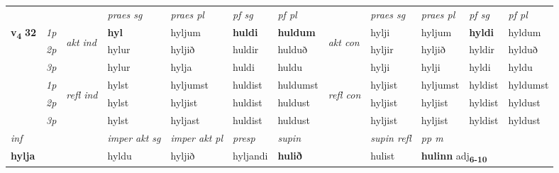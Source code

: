 \begin{longtable}[l]{X>{\footnotesize\itshape}llXXXXlXXXX}
 & &   & \textit{praes sg}  & \textit{praes pl}    & \textit{ pf sg} & \textit{pf pl} & & \textit{praes sg}  & \textit{praes pl}    & \textit{pf sg} & \textit{pf pl }  \\ \cmidrule{4-7} \cmidrule{9-12}
 \multirow{2}{*}{{{\textbf{v{\textsubscript{4}}} \Large{\textbf{32}}}}}  & 1p & \multirow{3}{*}{\begin{turn}{90}\textit{akt ind}\end{turn}} & \textbf{hyl} & hyljum & \textbf{huldi} & \textbf{huldum} & \multirow{3}{*}{\begin{turn}{90}\textit{akt con}\end{turn}} &hylji & hyljum & \textbf{hyldi} & hyldum\\*
 & 2p &  &  hylur  & hyljið & huldir & hulduð & & hyljir & hyljið & hyldir & hylduð \\*
 & 3p &  & hylur & hylja & huldi & huldu & & hylji & hylji& hyldi & hyldu \\*
\cmidrule{4-7} \cmidrule{9-12}
 & 1p & \multirow{3}{*}{\begin{turn}{90}\textit{refl ind}\end{turn}}  & hylst & hyljumst & huldist & huldumst & \multirow{3}{*}{\begin{turn}{90}\textit{refl con}\end{turn}}  &hyljist & hyljumst & hyldist & hyldumst \\*
 & 2p &  & hylst & hyljist & huldist & huldust & &hyljist & hyljist & hyldist & hyldust \\*
 & 3p  & & hylst & hyljast & huldist & huldust & & hyljist & hyljist& hyldist & hyldust \\*
\cmidrule{4-7} \cmidrule{9-12}

   {\textit{inf}} & &  & \textit{imper akt sg} & \textit{imper akt pl}   & \textit{presp} & \textit{supin} && \textit{supin refl} & \textit{pp m} \\*
  {\textbf{hylja}} & && hyldu  & hyljið   & hyljandi &  \textbf{hulið} && hulist & \multicolumn{2}{l}{\textbf{hulinn} adj\textbf{\textsubscript{6-10}}} \\*

\midrule


\end{longtable}
